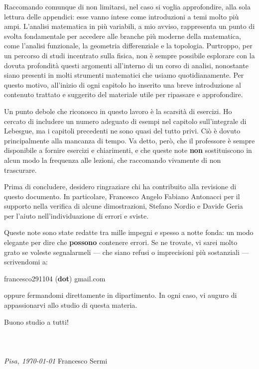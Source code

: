 \documentclass[12pt, twoside, italian]{book}
\begin{document}
	Raccomando comunque di non limitarsi, nel caso si voglia approfondire, alla sola lettura delle appendici: esse vanno intese come introduzioni a temi molto più ampi. L'analisi matematica in più variabili, a mio avviso, rappresenta un punto di svolta fondamentale per accedere alle branche più moderne della matematica, come l'analisi funzionale, la geometria differenziale e la topologia. Purtroppo, per un percorso di studi incentrato sulla fisica, non è sempre possibile esplorare con la dovuta profondità questi argomenti all'interno di un corso di analisi, nonostante siano presenti in molti strumenti matematici che usiamo quotidianamente. Per questo motivo, all'inizio di ogni capitolo ho inserito una breve introduzione al contenuto trattato e suggerito del materiale utile per ripassare e approfondire.\

	Un punto debole che riconosco in questo lavoro è la scarsità di esercizi. Ho cercato di includere un numero adeguato di esempi nel capitolo sull'integrale di Lebesgue, ma i capitoli precedenti ne sono quasi del tutto privi. Ciò è dovuto principalmente alla mancanza di tempo. Va detto, però, che il professore è sempre disponibile a fornire esercizi e chiarimenti, e che queste note \textbf{non} sostituiscono in alcun modo la frequenza alle lezioni, che raccomando vivamente di non trascurare.\

	Prima di concludere, desidero ringraziare chi ha contribuito alla revisione di questo documento. In particolare, Francesco Angelo Fabiano Antonacci per il supporto nella verifica di alcune dimostrazioni, Stefano Nordio e Davide Geria per l'aiuto nell'individuazione di errori e sviste.\

	Queste note sono state redatte tra mille impegni e spesso a notte fonda: un modo elegante per dire che \textbf{possono} contenere errori. Se ne trovate, vi sarei molto grato se voleste segnalarmeli — che siano refusi o imprecisioni più sostanziali — scrivendomi a:
	\begin{center}
	francesco291104 (\textbf{dot}) gmail.com
	\end{center}

	oppure fermandomi direttamente in dipartimento. In ogni caso, vi auguro di appassionarvi allo studio di questa materia.\

	Buono studio a tutti! \\ \\ \\ \\
	\emph{Pisa, \today} \hfill Francesco Sermi\
	\vfill
	\cleardoublepage
\end{document}
